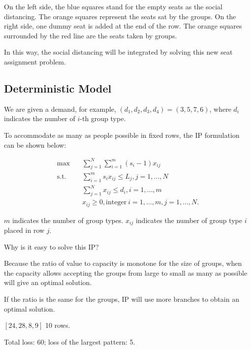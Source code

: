 On the left side, the blue squares stand for the empty seats as the social distancing. The orange squares represent the seats sat by the groups. 
On the right side, one dummy seat is added at the end of the row. The orange squares surrounded by the red line are the seats taken by groups.

In this way, the social distancing will be integrated by solving this new seat assignment problem.


\subsection{Deterministic Model}
We are given a demand, for example, $(d_1, d_2, d_3, d_4) = (3,5,7,6)$, where $d_i$ indicates the number of $i$-th group type.

To accommodate as many as people possible in fixed rows, the IP formulation can be shown below:

\begin{equation}\label{deter_upper}
    \begin{aligned}
      \max \quad & \sum_{j =1}^{N} \sum_{i = 1}^{m} (s_i -1) x_{ij} \\
      \text {s.t.} \quad & \sum_{i = 1}^{m} s_i x_{ij} \leq L_{j}, j=1,\ldots,N \\
      & \sum_{j =1}^{N} x_{ij} \leq d_{i}, i=1,\ldots,m \\
      & x_{ij} \geq 0, \text{integer}~ i=1,\ldots,m, j=1,\ldots,N.
    \end{aligned}
\end{equation}

$m$ indicates the number of group types. $x_{ij}$ indicates the number of group type $i$ placed in row $j$.

Why is it easy to solve this IP?

Because the ratio of value to capacity is monotone for the size of groups, when the capacity allows accepting the groups from large to small as many as possible will give an optimal solution.

If the ratio is the same for the groups, IP will use more branches to obtain an optimal solution.

$[24,28,8,9]$ 10 rows.

Total loss: 60; loss of the largest pattern: 5.
